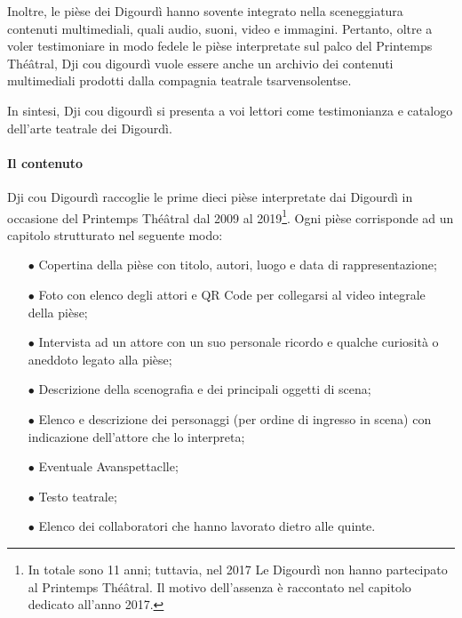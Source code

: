 Inoltre, le pièse dei Digourdì hanno sovente integrato nella sceneggiatura contenuti multimediali, quali audio, suoni, video e immagini. Pertanto, oltre a voler testimoniare in modo fedele le pièse interpretate sul palco del Printemps Thé\^atral, Dji cou digourdì vuole essere anche un archivio dei contenuti multimediali prodotti dalla compagnia teatrale tsarvensolentse.

In sintesi, Dji cou digourdì si presenta a voi lettori come testimonianza e catalogo dell'arte teatrale dei Digourdì.

\paragraph*{Il contenuto}
Dji cou Digourdì raccoglie le prime dieci pièse interpretate dai Digourdì in occasione del Printemps Thé\^atral dal 2009 al 2019\footnote{ In totale sono 11 anni; tuttavia, nel 2017 Le Digourdì non hanno partecipato al Printemps Thé\^atral. Il motivo dell'assenza è raccontato nel capitolo dedicato all'anno 2017.}. Ogni pièse corrisponde ad un capitolo strutturato nel seguente modo:
\begin{itemize}
\item[$\bullet$] Copertina della pièse con titolo, autori, luogo e data di rappresentazione;
\item[$\bullet$] Foto con elenco degli attori e QR Code per collegarsi al video integrale della pièse;
\item[$\bullet$] Intervista ad un attore con un suo personale ricordo e qualche curiosità o aneddoto legato alla pièse;
\item[$\bullet$] Descrizione della scenografia e dei principali oggetti di scena;
\item[$\bullet$] Elenco e descrizione dei personaggi (per ordine di ingresso in scena) con indicazione dell'attore che lo interpreta;
\item[$\bullet$] Eventuale Avanspettaclle;
\item[$\bullet$] Testo teatrale;
\item[$\bullet$] Elenco dei collaboratori che hanno lavorato dietro alle quinte.
\end{itemize}


